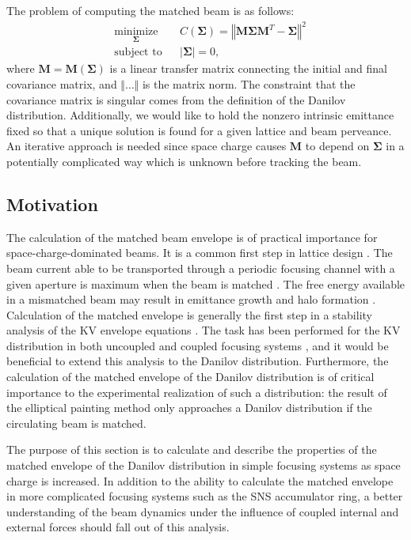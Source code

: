 The problem of computing the matched beam is as follows:
%
\begin{equation}
\begin{aligned}
    & \underset{\bm{\Sigma}}{\text{minimize}}
    & & C(\bm{\Sigma}) = \left\Vert{\mathbf{M} \bm{\Sigma} \mathbf{M}^T - \bm{\Sigma}}\right\Vert^2 \\
    & \text{subject to}
    & & |\bm{\Sigma}| = 0,
\end{aligned}
\end{equation}
%
where $\mathbf{M} = \mathbf{M}(\bm{\Sigma})$ is a linear transfer matrix connecting the initial and final covariance matrix, and $\Vert\dots\Vert$ is the matrix norm. The constraint that the covariance matrix is singular comes from the definition of the Danilov distribution. Additionally, we would like to hold the nonzero intrinsic emittance fixed so that a unique solution is found for a given lattice and beam perveance. An iterative approach is needed since space charge causes $\mathbf{M}$ to depend on $\bm{\Sigma}$ in a potentially complicated way which is unknown before tracking the beam. 


\subsection{Motivation}

The calculation of the matched beam envelope is of practical importance for space-charge-dominated beams. It is a common first step in lattice design \cite{Lund2006}. The beam current able to be transported through a periodic focusing channel with a given aperture is maximum when the beam is matched \cite{book:Reiser}. The free energy available in a mismatched beam may result in emittance growth and halo formation \cite{book:Reiser}. Calculation of the matched envelope is generally the first step in a stability analysis of the KV envelope equations \cite{Lund2006}. The task has been performed for the KV distribution in both uncoupled and coupled focusing systems \cite{Hofmann1983, Chernin1988, Ryne1995, Lund2006, Anderson2007, Goswami2016}, and it would be beneficial to extend this analysis to the Danilov distribution. Furthermore, the calculation of the matched envelope of the Danilov distribution is of critical importance to the experimental realization of such a distribution: the result of the elliptical painting method only approaches a Danilov distribution if the circulating beam is matched.

The purpose of this section is to calculate and describe the properties of the matched envelope of the Danilov distribution in simple focusing systems as space charge is increased. In addition to the ability to calculate the matched envelope in more complicated focusing systems such as the SNS accumulator ring, a better understanding of the beam dynamics under the influence of coupled internal and external forces should fall out of this analysis.

